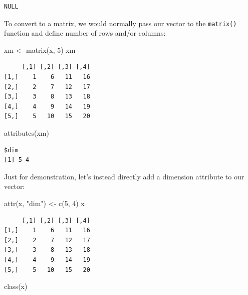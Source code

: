 \documentclass[
]{book}
\newenvironment{Shaded}{\begin{snugshade}}{\end{snugshade}}
\newcommand{\DecValTok}[1]{\textcolor[rgb]{0.00,0.00,0.81}{#1}}
\newcommand{\FunctionTok}[1]{\textcolor[rgb]{0.00,0.00,0.00}{#1}}
\newcommand{\NormalTok}[1]{#1}
\newcommand{\OtherTok}[1]{\textcolor[rgb]{0.56,0.35,0.01}{#1}}
\newcommand{\StringTok}[1]{\textcolor[rgb]{0.31,0.60,0.02}{#1}}
\begin{document}
\begin{verbatim}
NULL
\end{verbatim}

To convert to a matrix, we would normally pass our vector to the \texttt{matrix()} function and define number of rows and/or columns:

\begin{Shaded}
\begin{Highlighting}[]
\NormalTok{xm }\OtherTok{\textless{}{-}} \FunctionTok{matrix}\NormalTok{(x, }\DecValTok{5}\NormalTok{)}
\NormalTok{xm}
\end{Highlighting}
\end{Shaded}

\begin{verbatim}
     [,1] [,2] [,3] [,4]
[1,]    1    6   11   16
[2,]    2    7   12   17
[3,]    3    8   13   18
[4,]    4    9   14   19
[5,]    5   10   15   20
\end{verbatim}

\begin{Shaded}
\begin{Highlighting}[]
\FunctionTok{attributes}\NormalTok{(xm)}
\end{Highlighting}
\end{Shaded}

\begin{verbatim}
$dim
[1] 5 4
\end{verbatim}

Just for demonstration, let's instead directly add a dimension attribute to our vector:

\begin{Shaded}
\begin{Highlighting}[]
\FunctionTok{attr}\NormalTok{(x, }\StringTok{"dim"}\NormalTok{) }\OtherTok{\textless{}{-}} \FunctionTok{c}\NormalTok{(}\DecValTok{5}\NormalTok{, }\DecValTok{4}\NormalTok{)}
\NormalTok{x}
\end{Highlighting}
\end{Shaded}

\begin{verbatim}
     [,1] [,2] [,3] [,4]
[1,]    1    6   11   16
[2,]    2    7   12   17
[3,]    3    8   13   18
[4,]    4    9   14   19
[5,]    5   10   15   20
\end{verbatim}

\begin{Shaded}
\begin{Highlighting}[]
\FunctionTok{class}\NormalTok{(x)}
\end{Highlighting}
\end{Shaded}
\end{document}
